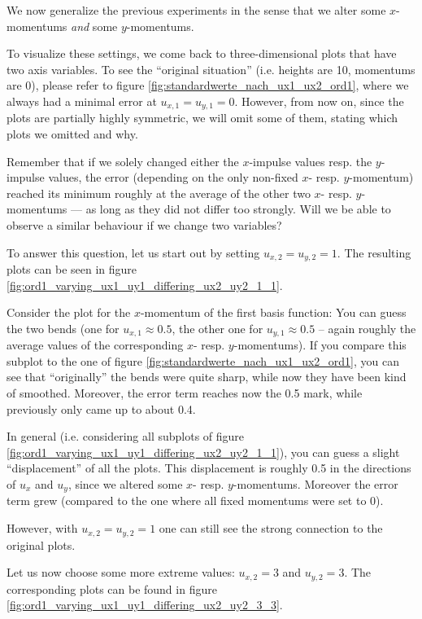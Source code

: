 \documentclass{article}
\begin{document}
We now generalize the previous experiments in the sense that we alter some $x$-momentums \emph{and} some $y$-momentums.

To visualize these settings, we come back to three-dimensional plots that have two axis variables. To see the ``original situation'' (i.e. heights are 10, momentums are 0), please refer to figure \ref{fig:standardwerte_nach_ux1_ux2_ord1}, where we always had a minimal error at $u_{x,1}=u_{y,1}=0$. However, from now on, since the plots are partially highly symmetric, we will omit some of them, stating which plots we omitted and why.

Remember that if we solely changed either the $x$-impulse values resp. the $y$-impulse values, the error (depending on the only non-fixed $x$- resp. $y$-momentum) reached its minimum roughly at the average of the other two $x$- resp. $y$-momentums --- as long as they did not differ too strongly. Will we be able to observe a similar behaviour if we change two variables? 

To answer this question, let us start out by setting $u_{x,2}=u_{y,2}=1$. The resulting plots can be seen in figure \ref{fig:ord1_varying_ux1_uy1_differing_ux2_uy2_1_1}.



Consider the plot for the $x$-momentum of the first basis function: You can guess the two bends (one for $u_{x,1}\approx 0.5$, the other one for $u_{y,1}\approx 0.5$ -- again roughly the average values of the corresponding $x$- resp. $y$-momentums). If you compare this subplot to the one of figure \ref{fig:standardwerte_nach_ux1_ux2_ord1}, you can see that ``originally'' the bends were quite sharp, while now they have been kind of smoothed. Moreover, the error term reaches now the 0.5 mark, while previously only came up to about 0.4.

In general (i.e. considering all subplots of figure \ref{fig:ord1_varying_ux1_uy1_differing_ux2_uy2_1_1}), you can guess a slight ``displacement'' of all the plots. This displacement is roughly 0.5 in the directions of $u_x$ and $u_y$, since we altered some $x$- resp. $y$-momentums. Moreover the error term grew (compared to the one where all fixed momentums were set to 0).

However, with $u_{x,2}=u_{y,2}=1$ one can still see the strong connection to the original plots. 

Let us now choose some more extreme values: $u_{x,2}=3$ and $u_{y,2}=3$. The corresponding plots can be found in figure \ref{fig:ord1_varying_ux1_uy1_differing_ux2_uy2_3_3}.
\end{document}
